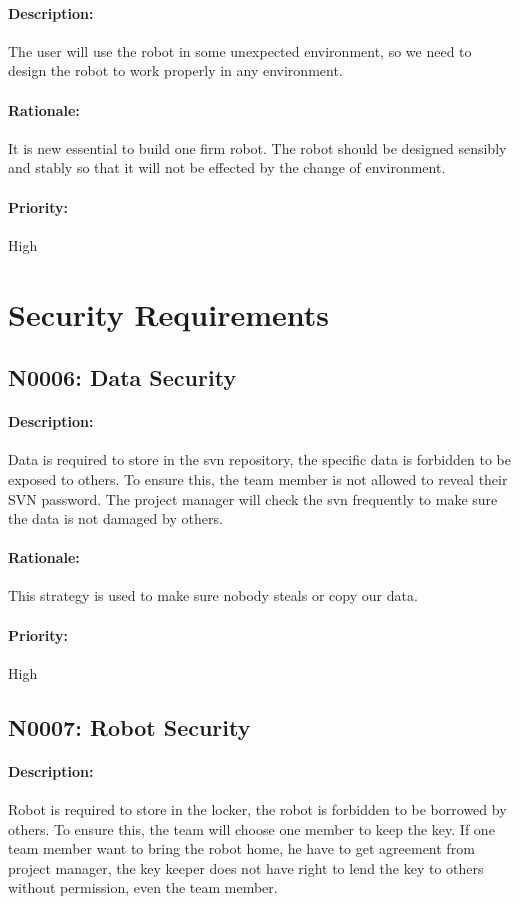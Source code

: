 \documentclass[11pt, a4paper]{report}
\begin{document}
\paragraph{Description:}
The user will use the robot in some unexpected environment, so we need to design the robot to work properly in any environment. 
\paragraph{Rationale:}
It is new essential to build one firm robot. The robot should be designed sensibly and stably so that it will not be effected by the change of environment. 
\paragraph{Priority:}
High

\section{Security Requirements}
\subsection{N0006: Data Security}
\paragraph{Description:}
Data is required to store in the svn repository, the specific data is forbidden to be exposed to others. To ensure this, the team member is not allowed to reveal their SVN password. The project manager will check the svn frequently to make sure the data is not damaged by others.
\paragraph{Rationale:}
This strategy is used to make sure nobody steals or copy our data.
\paragraph{Priority:}
High
\subsection{N0007: Robot Security}
\paragraph{Description:}
Robot is required to store in the locker, the robot is forbidden to be borrowed by others. To ensure this, the team will choose one member to keep the key. If one team member want to bring the robot home, he have to get agreement from project manager, the key keeper does not have right to lend the key to others without permission, even the team member. 
\end{document}
